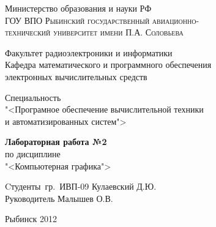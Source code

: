 	\begin{titlepage}
	\newpage
		\begin{center}
			Министерство образования и науки РФ\\
			\textsc{ГОУ ВПО Рыбинский государственный авиационно-\\
			технический университет имени П.А. Соловьева}
		\end{center}
		\vspace{1em}
		\begin{center}
			Факультет радиоэлектроники и информатики\\
			Кафедра математического и программного обеспечения\\
			электронных вычислительных средств\\
		\end{center}
		\begin{center}
			Специальность\\
			"<Програмное обеспечение вычислительной техники\\
			и автоматизированных систем">
		\end{center}
		\vspace{4cm}
		\begin{center}
			{\bfseries Лабораторная работа №2}\\
			по дисциплине\\
			"<Компьютерная графика">\\
		\end{center}
		\begin{flushleft}
			Cтуденты~гр.~ИВП-09 \hrulefill Кулаевский Д.Ю.\\
			Руководитель \hrulefill Малышев О.В.
		\end{flushleft}
		\vspace{\fill}
		\begin{center}
			Рыбинск 2012
		\end{center}
	\end{titlepage}